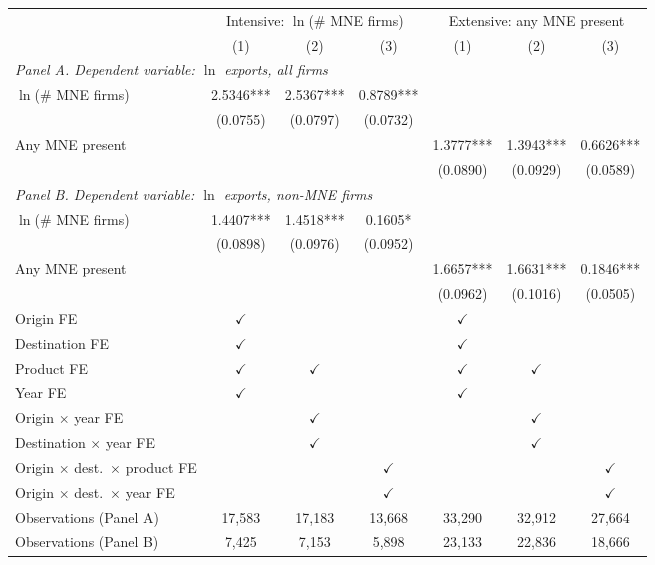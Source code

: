 \begin{tabular}{lcccccc} \hline
 & \multicolumn{3}{c}{Intensive: $\ln$(\# MNE firms)} & \multicolumn{3}{c}{Extensive: any MNE present} \\
 & (1) & (2) & (3) & (1) & (2) & (3) \\ \hline
\multicolumn{7}{l}{\textit{Panel A. Dependent variable: $\ln$ exports, all firms}} \\
$\ln$(\# MNE firms) & 2.5346*** & 2.5367*** & 0.8789*** &  &  &  \\
 & (0.0755) & (0.0797) & (0.0732) &  &  &  \\
Any MNE present &  &  &  & 1.3777*** & 1.3943*** & 0.6626*** \\
 &  &  &  & (0.0890) & (0.0929) & (0.0589) \\
\midrule
\multicolumn{7}{l}{\textit{Panel B. Dependent variable: $\ln$ exports, non-MNE firms}} \\
$\ln$(\# MNE firms) & 1.4407*** & 1.4518*** & 0.1605* &  &  &  \\
 & (0.0898) & (0.0976) & (0.0952) &  &  &  \\
Any MNE present &  &  &  & 1.6657*** & 1.6631*** & 0.1846*** \\
 &  &  &  & (0.0962) & (0.1016) & (0.0505) \\
\hline
Origin FE & $\checkmark$ &  &  & $\checkmark$ &  &  \\
Destination FE & $\checkmark$ &  &  & $\checkmark$ &  &  \\
Product FE & $\checkmark$ & $\checkmark$ &  & $\checkmark$ & $\checkmark$ &  \\
Year FE & $\checkmark$ &  &  & $\checkmark$ &  &  \\
Origin $\times$ year FE &  & $\checkmark$ &  &  & $\checkmark$ &  \\
Destination $\times$ year FE &  & $\checkmark$ &  &  & $\checkmark$ &  \\
Origin $\times$ dest.\ $\times$ product FE &  &  & $\checkmark$ &  &  & $\checkmark$ \\
Origin $\times$ dest.\ $\times$ year FE &  &  & $\checkmark$ &  &  & $\checkmark$ \\
Observations (Panel A) & 17,583 & 17,183 & 13,668 & 33,290 & 32,912 & 27,664 \\
Observations (Panel B) & 7,425 & 7,153 & 5,898 & 23,133 & 22,836 & 18,666 \\
\hline
\end{tabular}
